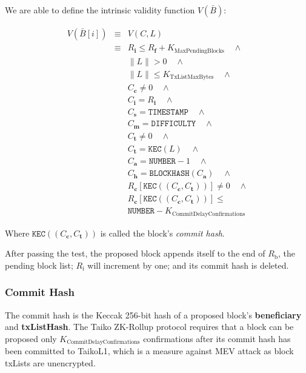 \documentclass[9pt,oneside]{amsart}
\begin{document}
\begin{multicols}{2}
We are able to define the intrinsic validity function $V(\bar{B})$:

\begin{eqnarray}
V(\bar{B}[i]) & \equiv &   V(C,L)  \\
\nonumber & \equiv &   R_\mathbf{i} \le R_\mathbf{f} + K_\mathrm{MaxPendingBlocks}   \quad \wedge \\
\nonumber& & \lVert L \rVert > 0 \quad \wedge \\
\nonumber & & \lVert L \rVert \le K_{\mathrm{TxListMaxBytes}} \quad \wedge \\
\nonumber& & C_{\mathbf{c}} \ne 0   \quad \wedge \\
\nonumber& & C_{\mathbf{i}} = R_\mathbf{i}   \quad \wedge \\
\nonumber& & C_{\mathbf{s}} = \texttt{TIMESTAMP}   \quad \wedge \\
\nonumber& & C_{\mathbf{m}} = \texttt{DIFFICULTY}   \quad \wedge \\
\nonumber& & C_{\mathbf{t}} \ne 0   \quad \wedge \\
\nonumber& & C_{\mathbf{t}} = \texttt{KEC}(L)   \quad \wedge \\
\nonumber& & C_{\mathbf{a}} = \texttt{NUMBER} - 1   \quad \wedge \\
\nonumber& & C_{\mathbf{h}} = \texttt{BLOCKHASH}(C_{\mathbf{a}})   \quad \wedge \\
\nonumber& & R_{\mathbf{c}}[\texttt{KEC}((C_{\mathbf{c}}, C_{\mathbf{t}}))] \ne 0  \quad \wedge \\
\nonumber& & R_{\mathbf{c}}[\texttt{KEC}((C_{\mathbf{c}}, C_{\mathbf{t}}))] \le  \\
\nonumber& &  \texttt{NUMBER}   -  K_{\mathrm{CommitDelayConfirmations}}
\end{eqnarray}

Where $\texttt{KEC}((C_{\mathbf{c}}, C_{\mathbf{t}}))$ is called the block's \textit{commit hash}.

After passing the test, the proposed block appends itself to the end of $R_\mathrm{b}$, the pending block list; $R_\mathrm{i}$ will increment by one; and its commit hash is deleted.


\subsubsection{Commit Hash} The commit hash is the Keccak 256-bit hash of a proposed block's \textbf{beneficiary} and \textbf{txListHash}. The Taiko ZK-Rollup protocol requires that a block can be proposed only $K_{\mathrm{CommitDelayConfirmations}}$ confirmations after its commit hash has been committed to  {TaikoL1}, which is a measure against MEV attack \cite{mevethfoundation} as block txLists are unencrypted.


\end{multicols}
\end{document}
